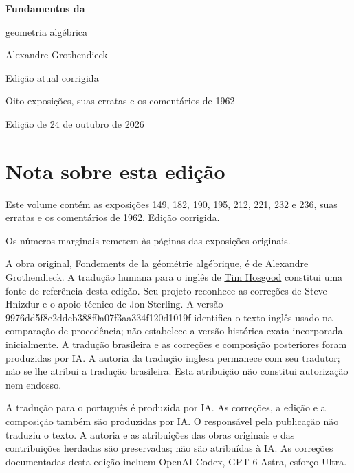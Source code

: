\documentclass[11pt,twoside,openany]{book}
\numberwithin{equation}{section}
\theoremstyle{plain}
\theoremstyle{definition}
\theoremstyle{remark}
\begin{document}
\frontmatter
\begin{titlepage}
\centering
\vspace*{0.13\textheight}
{\Huge\bfseries Fundamentos da\par geometria algébrica\par}
\vspace{1.5\baselineskip}
{\Large Alexandre Grothendieck\par}
\vfill
{\Large Edição atual corrigida\par}
\vspace{\baselineskip}
{\large Oito exposições, suas erratas e os comentários de 1962\par}
\vspace{1.5\baselineskip}
{\normalsize Edição de 24 de outubro de 2026\par}
\end{titlepage}
\chapter*{Nota sobre esta edição}
Este volume contém as exposições 149, 182, 190, 195, 212, 221, 232 e 236, suas erratas e os comentários de 1962. Edição corrigida.

Os números marginais remetem às páginas das exposições originais.

A obra original, Fondements de la géométrie algébrique, é de Alexandre Grothendieck. A tradução humana para o inglês de \href{https://github.com/thosgood/fga/tree/9976dd5f8e2ddcb388f0a07f3aa334f120d1019f}{Tim Hosgood} constitui uma fonte de referência desta edição. Seu projeto reconhece as correções de Steve Hnizdur e o apoio técnico de Jon Sterling. A versão 9976dd5f8e2ddcb388f0a07f3aa334f120d1019f identifica o texto inglês usado na comparação de procedência; não estabelece a versão histórica exata incorporada inicialmente. A tradução brasileira e as correções e composição posteriores foram produzidas por IA. A autoria da tradução inglesa permanece com seu tradutor; não se lhe atribui a tradução brasileira. Esta atribuição não constitui autorização nem endosso.

A tradução para o português é produzida por IA. As correções, a edição e a composição também são produzidas por IA. O responsável pela publicação não traduziu o texto. A autoria e as atribuições das obras originais e das contribuições herdadas são preservadas; não são atribuídas à IA. As correções documentadas desta edição incluem OpenAI Codex, GPT-6 Astra, esforço Ultra.
\end{document}
